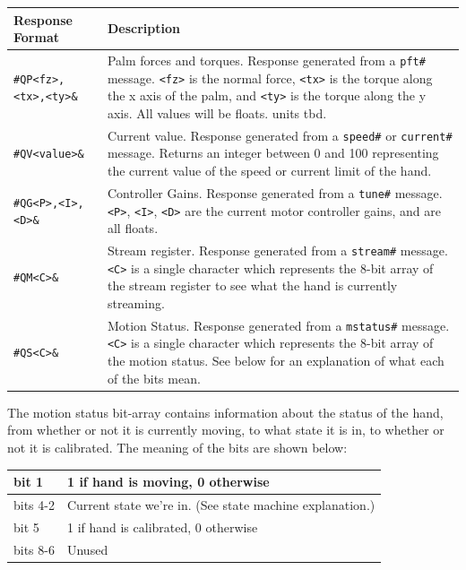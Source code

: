 \documentclass[letterpaper,notitlepage,10pt]{article}
\begin{document}
\begin{tabular}{l|p{}}
Response Format & Description \\
\hline


\verb;#QP<fz>,<tx>,<ty>&; & Palm forces and torques. Response generated from a \verb;pft#; message. \verb;<fz>; is the normal force, \verb;<tx>; is the torque along the x axis of the palm, and \verb;<ty>; is the torque along the y axis. All values will be floats. units tbd.\\

\verb;#QV<value>&; & Current value. Response generated from a \verb;speed#; or \verb;current#; message. Returns an integer between 0 and 100 representing the current value of the speed or current limit of the hand. \\

\verb;#QG<P>,<I>,<D>&; & Controller Gains. Response generated from a \verb;tune#; message. \verb;<P>;, \verb;<I>;, \verb;<D>; are the current motor controller gains, and are all floats. \\

\verb;#QM<C>&; & Stream register. Response generated from a \verb;stream#; message. \verb;<C>; is a single character which represents the 8-bit array of the stream register to see what the hand is currently streaming. \\

\verb;#QS<C>&; & Motion Status. Response generated from a \verb;mstatus#; message. \verb;<C>; is a single character which represents the 8-bit array of the motion status. See below for an explanation of what each of the bits mean. \\

\end{tabular}

\bigskip

\noindent The motion status bit-array contains information about the status of the hand, from whether or not it is currently moving, to what state it is in, to whether or not it is calibrated. The meaning of the bits are shown below:\\

\begin{tabular}{|l|l|}
\hline
bit 1 & 1 if hand is moving, 0 otherwise \\ \hline
bits 4-2 & Current state we're in. (See state machine explanation.) \\ \hline
bit 5 & 1 if hand is calibrated, 0 otherwise \\ \hline
bits 8-6 & Unused \\ \hline
\end{tabular}
\end{document}
